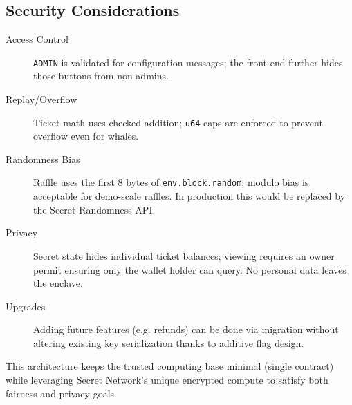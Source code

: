 \documentclass[12pt]{article}
\begin{document}
\subsection*{Security Considerations}
\begin{description}
  \item[Access Control] \verb|ADMIN| is validated for configuration messages; the front-end further hides those buttons from non-admins.
  \item[Replay/Overflow] Ticket math uses checked addition; \verb|u64| caps are enforced to prevent overflow even for whales.
  \item[Randomness Bias] Raffle uses the first 8 bytes of \texttt{env.block.random}; modulo bias is acceptable for demo-scale raffles.  In production this would be replaced by the Secret Randomness API.
  \item[Privacy] Secret state hides individual ticket balances; viewing requires an owner permit ensuring only the wallet holder can query.  No personal data leaves the enclave.
  \item[Upgrades] Adding future features (e.g. refunds) can be done via migration without altering existing key serialization thanks to additive flag design.
\end{description}

This architecture keeps the trusted computing base minimal (single contract) while leveraging Secret Network's unique encrypted compute to satisfy both fairness and privacy goals.
\end{document}
